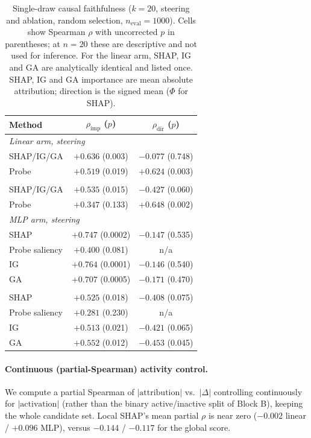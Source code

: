 \begin{table}[H]
\centering
\small
\setlength{\tabcolsep}{5pt}
\caption{Single-draw causal faithfulness ($k=20$, steering and ablation, random selection, $n_\text{eval}=1000$). Cells show Spearman $\rho$ with uncorrected $p$ in parentheses; at $n=20$ these are descriptive and not used for inference. For the linear arm, SHAP, IG and GA are analytically identical and listed once. SHAP, IG and GA importance are mean absolute attribution; direction is the signed mean ($\Phi$ for SHAP).}
\label{tab:headline-faithfulness}
\begin{tabular}{lcc}
\toprule
Method & $\rho_\text{imp}$ ($p$) & $\rho_\text{dir}$ ($p$) \\
\midrule
\multicolumn{3}{l}{\textit{Linear arm, steering}} \\
SHAP/IG/GA     & $+0.636$ (0.003) & $-0.077$ (0.748) \\
Probe          & $+0.519$ (0.019) & $+0.624$ (0.003) \\
\addlinespace
\multicolumn{3}{l}{\textit{Linear arm, ablation}} \\
SHAP/IG/GA     & $+0.535$ (0.015) & $-0.427$ (0.060) \\
Probe          & $+0.347$ (0.133) & $+0.648$ (0.002) \\
\midrule
\multicolumn{3}{l}{\textit{MLP arm, steering}} \\
SHAP           & $+0.747$ (0.0002) & $-0.147$ (0.535) \\
Probe saliency & $+0.400$ (0.081) & n/a \\
IG             & $+0.764$ (0.0001) & $-0.146$ (0.540) \\
GA             & $+0.707$ (0.0005) & $-0.171$ (0.470) \\
\addlinespace
\multicolumn{3}{l}{\textit{MLP arm, ablation}} \\
SHAP           & $+0.525$ (0.018) & $-0.408$ (0.075) \\
Probe saliency & $+0.281$ (0.230) & n/a \\
IG             & $+0.513$ (0.021) & $-0.421$ (0.065) \\
GA             & $+0.552$ (0.012) & $-0.453$ (0.045) \\
\bottomrule
\end{tabular}
\end{table}


\paragraph{Continuous (partial-Spearman) activity control.} We compute a
partial Spearman of $|\text{attribution}|$ vs.\ $|\Delta|$ controlling
continuously for $|\text{activation}|$ (rather than the binary
active/inactive split of Block B), keeping the whole candidate set. Local
SHAP's mean partial $\rho$ is near zero ($-0.002$ linear / $+0.096$ MLP),
versus $-0.144$ / $-0.117$ for the global score.



